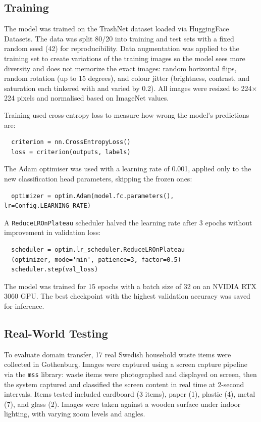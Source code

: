 \documentclass[11pt,a4paper]{article}
\begin{document}
\subsection{Training}

The model was trained on the TrashNet dataset loaded via HuggingFace Datasets. The data was split 80/20 into training and test sets with a fixed random seed (42) for reproducibility. Data augmentation was applied to the training set to create variations of the training images so the model sees more diversity and does not memorize the exact images: random horizontal flips, random rotation (up to 15 degrees), and colour jitter (brightness, contrast, and saturation each tinkered with and varied by 0.2). All images were resized to 224$\times$224 pixels and normalised based on ImageNet values.

Training used cross-entropy loss to measure how wrong the model's predictions are:

\begin{verbatim}
  criterion = nn.CrossEntropyLoss()
  loss = criterion(outputs, labels)
\end{verbatim}

The Adam optimiser was used with a learning rate of 0.001, applied only to the new classification head parameters, skipping the frozen ones:

\begin{verbatim}
  optimizer = optim.Adam(model.fc.parameters(), lr=Config.LEARNING_RATE)
\end{verbatim}

A \texttt{ReduceLROnPlateau} scheduler halved the learning rate after 3 epochs without improvement in validation loss:

\begin{verbatim}
  scheduler = optim.lr_scheduler.ReduceLROnPlateau
  (optimizer, mode='min', patience=3, factor=0.5)
  scheduler.step(val_loss)
\end{verbatim}

The model was trained for 15 epochs with a batch size of 32 on an NVIDIA RTX 3060 GPU. The best checkpoint with the highest validation accuracy was saved for inference.

\subsection{Real-World Testing}

To evaluate domain transfer, 17 real Swedish household waste items were collected in Gothenburg. Images were captured using a screen capture pipeline via the \texttt{mss} library: waste items were photographed and displayed on screen, then the system captured and classified the screen content in real time at 2-second intervals. Items tested included cardboard (3 items), paper (1), plastic (4), metal (7), and glass (2). Images were taken against a wooden surface under indoor lighting, with varying zoom levels and angles.
\end{document}
